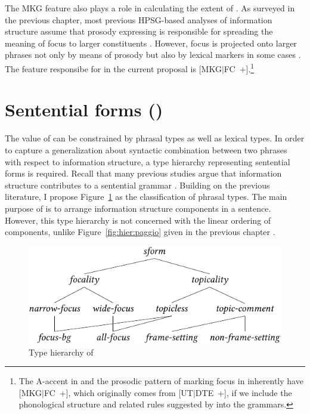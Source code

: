 The MKG feature also plays a role in calculating the extent of
. As surveyed in the previous
chapter, most previous HPSG-based analyses of information structure
assume that prosody expressing  is responsible for
spreading the meaning of focus to larger constituents
\citep{bildhauer:07}.  However, focus is projected onto larger phrases
not only by means of prosody but also by lexical markers in some cases
\citep{choe:02}. The feature responsibe for
 in the current proposal is \mbox{[MKG{$\mid$}FC
    +]}.\footnote{The A-accent in  and the prosodic
  pattern of marking focus in  inherently have
  \mbox{[MKG{$\mid$}FC +]}, which originally comes from
  \mbox{[UT{$\mid$}DTE +]}, if we include the phonological structure
  and related rules suggested by \citet{bildhauer:07} into the
  grammars.}




\section{Sentential forms \textnormal{(}\textnormal{)}}
\label{9:ssec:sform}


The value of  can be constrained by phrasal types as well
as lexical types. In order to
capture a generalization about syntactic combination between two
phrases with respect to information structure, a type hierarchy
representing sentential forms is required. Recall that many previous
studies argue that information structure contributes to a sentential
grammar
\citep{lambrecht:96,engdahl:vallduvi:96,paggio:09,song:bender:11}.
Building on the previous literature, I propose Figure~\ref{fig:sform}
as the classification of phrasal types. The main purpose of
 is to arrange information structure components in a
sentence. However, this type hierarchy is not
concerned with the linear ordering of components, unlike
Figure~\ref{fig:hier:paggio} given in the previous
chapter .



\begin{figure}[!t]
\begin{center} 
\includegraphics{pdf/sform.pdf}
\caption{Type hierarchy of }
\label{fig:sform}
\end{center}
\end{figure}


